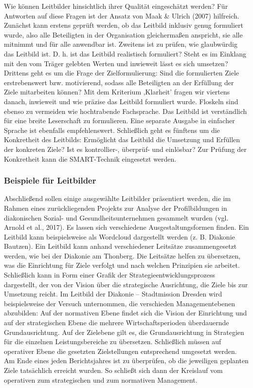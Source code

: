 \documentclass[
  letterpaper,
]{book}
\begin{document}
Wie können Leitbilder hinsichtlich ihrer Qualität eingeschätzt werden?
Für Antworten auf diese Fragen ist der Ansatz von Maak \& Ulrich (2007)
hilfreich. Zunächst kann erstens geprüft werden, ob das Leitbild
inklusiv genug formuliert wurde, also alle Beteiligten in der
Organisation gleichermaßen anspricht, sie alle mitnimmt und für alle
anwendbar ist. Zweitens ist zu prüfen, wie glaubwürdig das Leitbild ist.
D. h. ist das Leitbild realistisch formuliert? Steht es im Einklang mit
den vom Träger gelebten Werten und inwieweit lässt es sich umsetzen?
Drittens geht es um die Frage der Zielformulierung: Sind die
formulierten Ziele erstrebenswert bzw. motivierend, sodass alle
Beteiligten an der Erfüllung der Ziele mitarbeiten können? Mit dem
Kriterium ‚Klarheit' fragen wir viertens danach, inwieweit und wie
präzise das Leitbild formuliert wurde. Floskeln sind ebenso zu vermeiden
wie hochtrabende Fachsprache. Das Leitbild ist verständlich für eine
breite Leserschaft zu formulieren. Eine separate Ausgabe in einfacher
Sprache ist ebenfalls empfehlenswert. Schließlich geht es fünftens um
die Konkretheit des Leitbilds: Ermöglicht das Leitbild die Umsetzung und
Erfüllen der konkreten Ziele? Ist es kontrollier-, überprüf- und
einlösbar? Zur Prüfung der Konkretheit kann die SMART-Technik eingesetzt
werden.

\subsubsection{Beispiele für
Leitbilder}\label{beispiele-fuxfcr-leitbilder}

Abschließend sollen einige ausgewählte Leitbilder präsentiert werden,
die im Rahmen eines zurückliegenden Projekts zur Analyse der
Profilbildungen in diakonischen Sozial- und Gesundheitsunternehmen
gesammelt wurden (vgl. Arnold et al., 2017). Es lassen sich verschiedene
Ausgestaltungsformen finden. Ein Leitbild kann beispielsweise als
Wordcloud dargestellt werden (z. B. Diakonie Bautzen). Ein Leitbild kann
anhand verschiedener Leitsätze zusammengesetzt werden, wie bei der
Diakonie am Thonberg. Die Leitsätze helfen zu übersetzen, was die
Einrichtung für Ziele verfolgt und nach welchen Prinzipien sie arbeitet.
Schließlich kann in Form einer Grafik der Strategieentwicklungsprozess
dargestellt, der von der Vision über die strategische Ausrichtung, die
Ziele bis zur Umsetzung reicht. Im Leitbild der Diakonie -- Stadtmission
Dresden wird beispielsweise der Versuch unternommen, die verschieden
Managementebenen abzubilden: Auf der normativen Ebene findet sich die
Vision der Einrichtung und auf der strategischen Ebene die mehrere
Wirtschaftsperioden überdauernde Grundausrichtung. Auf der Zielebene
gilt es, die Grundausrichtung in Strategien für die einzelnen
Leistungsbereiche zu übersetzen. Schließlich müssen auf operativer Ebene
die gesetzten Zielstellungen entsprechend umgesetzt werden. Am Ende
eines jeden Berichtsjahres ist zu überprüfen, ob die jeweiligen
geplanten Ziele tatsächlich erreicht wurden. So schließt sich dann der
Kreislauf vom operativen zum strategischen und zum normativen
Management.
\end{document}
